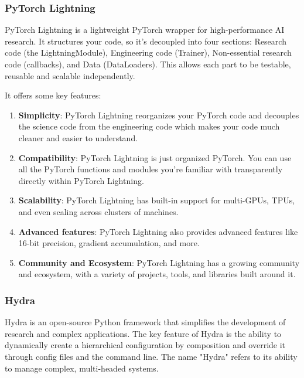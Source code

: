 \subsubsection{PyTorch Lightning}
PyTorch Lightning is a lightweight PyTorch wrapper for high-performance AI research. It structures your code, so it's decoupled into four sections: Research code (the LightningModule), Engineering code (Trainer), Non-essential research code (callbacks), and Data (DataLoaders). This allows each part to be testable, reusable and scalable independently.

It offers some key features:
\begin{enumerate}
    \item \textbf{Simplicity}: PyTorch Lightning reorganizes your PyTorch code and decouples the science code from the engineering code which makes your code much cleaner and easier to understand.
    \item \textbf{Compatibility}: PyTorch Lightning is just organized PyTorch. You can use all the PyTorch functions and modules you're familiar with transparently directly within PyTorch Lightning.
    \item \textbf{Scalability}: PyTorch Lightning has built-in support for multi-GPUs, TPUs, and even scaling across clusters of machines.
    \item \textbf{Advanced features}: PyTorch Lightning also provides advanced features like 16-bit precision, gradient accumulation, and more.
    \item \textbf{Community and Ecosystem}: PyTorch Lightning has a growing community and ecosystem, with a variety of projects, tools, and libraries built around it.
\end{enumerate}

\subsubsection{Hydra}
Hydra is an open-source Python framework that simplifies the development of research and complex applications. The key feature of Hydra is the ability to dynamically create a hierarchical configuration by composition and override it through config files and the command line. The name "Hydra" refers to its ability to manage complex, multi-headed systems.

